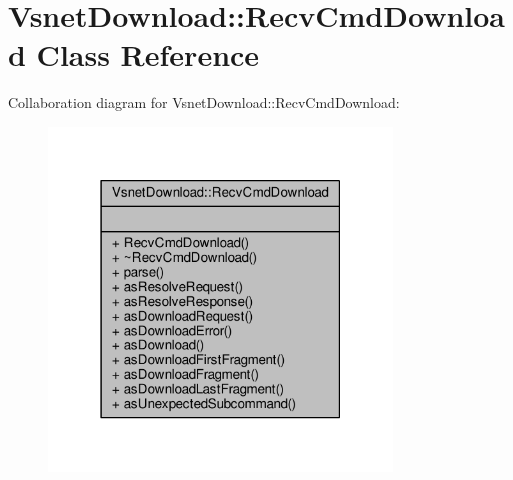 \hypertarget{classVsnetDownload_1_1RecvCmdDownload}{}\section{Vsnet\+Download\+:\+:Recv\+Cmd\+Download Class Reference}
\label{classVsnetDownload_1_1RecvCmdDownload}


Collaboration diagram for Vsnet\+Download\+:\+:Recv\+Cmd\+Download\+:
\nopagebreak
\begin{figure}[H]
\begin{center}
\leavevmode
\includegraphics[width=259pt]{de/d75/classVsnetDownload_1_1RecvCmdDownload__coll__graph}
\end{center}
\end{figure}
